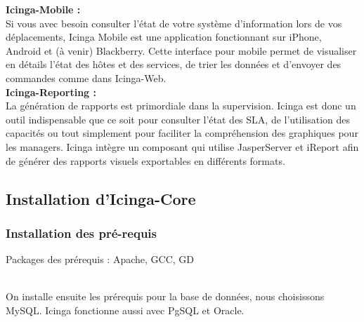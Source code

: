 		\textbf{Icinga-Mobile : }\\
		
		Si vous avec besoin consulter l'état de votre système d'information lors de vos déplacements, Icinga Mobile est une application fonctionnant sur iPhone, Android et (à venir) Blackberry. Cette interface pour mobile permet de visualiser en détails l'état des hôtes et des services, de trier les données et d'envoyer des commandes comme dans Icinga-Web.\\

		\textbf{Icinga-Reporting :}\\
		
		La génération de rapports est primordiale dans la supervision. Icinga est donc un outil indispensable que ce soit pour consulter l'état des SLA, de l'utilisation des capacités ou tout simplement pour faciliter la compréhension des graphiques pour les managers. Icinga intègre un composant qui utilise JasperServer et iReport afin de générer des rapports visuels exportables en différents formats.\\

	\subsection{Installation d'Icinga-Core}
		\subsubsection{Installation des pré-requis}
			\vspace{0.3cm}
			Packages des prérequis : Apache, GCC, GD
			
			\\
			
			
			On installe ensuite les prérequis pour la base de données, nous choisissons MySQL. Icinga fonctionne aussi avec PgSQL et Oracle.
			
			\\

